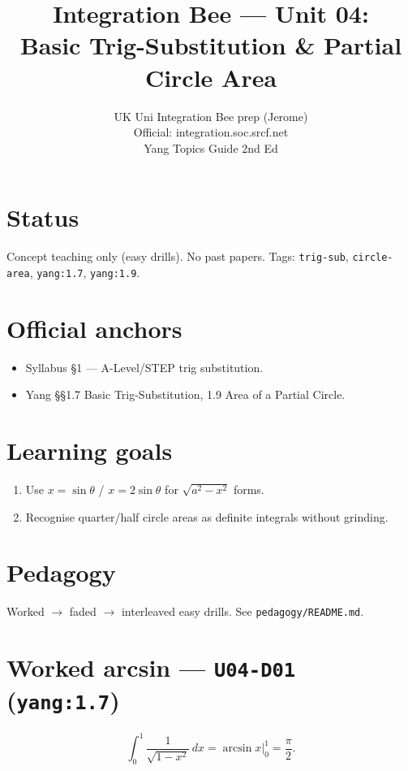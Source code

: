 
\title{Integration Bee --- Unit 04:\\ Basic Trig-Substitution \& Partial Circle Area}
\author{UK Uni Integration Bee prep (Jerome)\\ Official: integration.soc.srcf.net\\ Yang Topics Guide 2nd Ed}
\date{}

\maketitle

\section*{Status}
Concept teaching only (easy drills). No past papers.
Tags: \texttt{trig-sub}, \texttt{circle-area}, \texttt{yang:1.7}, \texttt{yang:1.9}.

\section{Official anchors}
\begin{itemize}
  \item Syllabus §1 --- A-Level/STEP trig substitution.
  \item Yang §§1.7 Basic Trig-Substitution, 1.9 Area of a Partial Circle.
\end{itemize}

\section{Learning goals}
\begin{enumerate}
  \item Use $x=\sin\theta$ / $x=2\sin\theta$ for $\sqrt{a^2-x^2}$ forms.
  \item Recognise quarter/half circle areas as definite integrals without grinding.
\end{enumerate}

\section{Pedagogy}
Worked $\to$ faded $\to$ interleaved easy drills. See \texttt{pedagogy/README.md}.


\section{Worked arcsin --- \texttt{U04-D01} (\texttt{yang:1.7})}
\[
\int_0^1\frac{1}{\sqrt{1-x^2}}\,dx = \arcsin x\Big|_0^1=\frac\pi2.
\]

